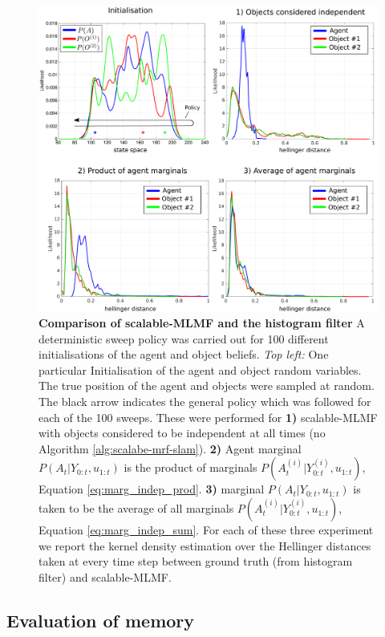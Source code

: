 \begin{figure}
\centering
 \includegraphics[width=\textwidth]{./ch5-MLMF/Figures/Figure13_v2.pdf}
 \caption{\textbf{Comparison of scalable-MLMF and the histogram filter} A deterministic sweep policy was carried out for 100 different initialisations of 
 the agent and object beliefs. \textit{Top left:} One particular Initialisation of the agent and object
 random variables. The true position of the agent and objects were sampled at random. The black arrow indicates the general policy which was 
 followed for each of the 100 sweeps. 
 These were performed for \textbf{1)} scalable-MLMF  with objects considered to be independent at all times (no Algorithm \ref{alg:scalabe-mrf-slam}). 
 \textbf{2)} Agent marginal $P(A_t|Y_{0:t},u_{1:t})$ is the product of marginals $P(A^{(i)}_t|Y^{(i)}_{0:t},u_{1:t})$, Equation \ref{eq:marg_indep_prod}. 
 \textbf{3)} marginal $P(A_t|Y_{0:t},u_{1:t})$ is taken to be the average of all marginals $P(A^{(i)}_t|Y^{(i)}_{0:t},u_{1:t})$, Equation \ref{eq:marg_indep_sum}.  For each of these three experiment we report the 
 kernel density estimation over the Hellinger distances taken at every time step between ground truth (from histogram filter) and scalable-MLMF.}
 \label{fig:independence_assumption_test}
\end{figure}

\subsection{Evaluation of memory}

